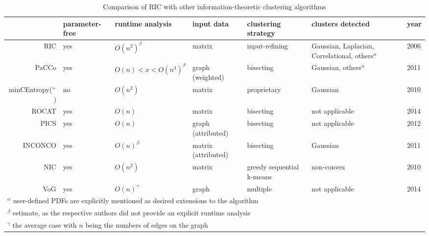 \documentclass[conference]{IEEEtran}
\begin{document}
\begin{table}
  \caption{Comparison of RIC with other information-theoretic clustering algorithms}
  \label{tab:comp}
  \begin{tabularx}{\textwidth}{rlllXXl}
  	\toprule
  	                    & parameter-free & runtime analysis              & input data          & clustering strategy & clusters detected                                       & year \\ \midrule
  	                RIC & yes            & $ O(n^2)^{\beta} $            & matrix              & input-refining      & Gaussian, Laplacian, Correlational, others$ ^{\alpha} $ & 2006 \\
  	              PaCCo & yes            & $ O(n) < x < O(n^3)^{\beta} $ & graph (weighted)    & bisecting             & Gaussian, others$ ^{\alpha} $                           & 2011 \\
  	minCEntropy($ ^+ $) & no             & $ O(n^2) $                    & matrix              & proprietary         & Gaussian                                                & 2010 \\
  	              ROCAT & yes            & $ O(n) $                      & matrix              & bisecting         & not applicable                                          & 2014 \\
  	               PICS & yes            & $ O(n) $                      & graph (attributed)  & bisecting         & not applicable                                          & 2012 \\
  	            INCONCO & yes            &           $ O(n)^\beta $                    & matrix (attributed) & bisecting                    & Gaussian                                                & 2011 \\
  	                NIC & yes            &     $ O(n^2) $                          &    matrix                 &      greedy sequential k-means               &      non-convex                                                   & 2010 \\
  	                VoG &  yes              &     $ O(n)^\gamma $                          &     graph                &      multiple               &          not applicable                                               & 2014 \\ \bottomrule
  	\multicolumn{7}{l}{$ ^{\alpha} $ user-defined PDFs are explicitly mentioned as desired extensions to the algorithm}                                                               \\
  	\multicolumn{7}{l}{$ ^{\beta} $ estimate, as the respective authors did not provide an explicit runtime analysis} \\
    \multicolumn{7}{l}{$ ^{\gamma} $ the average case with $ n $ being the numbers of edges on the graph}
  \end{tabularx}
\end{table}
\end{document}
